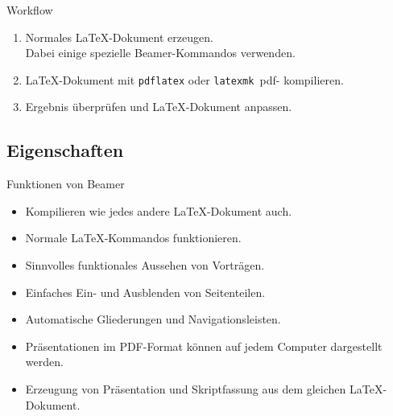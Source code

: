 \begin{Frame}{Workflow}
  \begin{enumerate}
    \item Normales \LaTeX-Dokument erzeugen.\\
      Dabei einige spezielle Beamer-Kommandos verwenden.
    \item \LaTeX-Dokument mit \lstinline-pdflatex- oder \lstinline-latexmk -pdf- kompilieren.
    \item Ergebnis überprüfen und \LaTeX-Dokument anpassen.
  \end{enumerate}
\end{Frame}

\subsection{Eigenschaften}

\begin{Frame}{Funktionen von Beamer}
  \begin{itemize}
    \item Kompilieren wie jedes andere \LaTeX-Dokument auch.
    \item Normale \LaTeX-Kommandos funktionieren.
    \item Sinnvolles funktionales Aussehen von Vorträgen.
    \item Einfaches Ein- und Ausblenden von Seitenteilen.
    \item Automatische Gliederungen und Navigationsleisten.
    \item Präsentationen im PDF-Format können auf jedem Computer dargestellt werden.
    \item Erzeugung von Präsentation und Skriptfassung aus dem gleichen \LaTeX-Dokument.
  \end{itemize}
\end{Frame}

